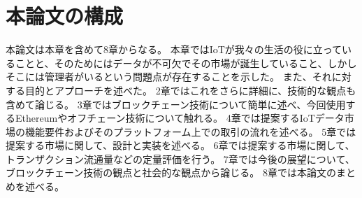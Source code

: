 \section{本論文の構成}
本論文は本章を含めて8章からなる。
本章ではIoTが我々の生活の役に立っていることと、そのためにはデータが不可欠でその市場が誕生していること、しかしそこには管理者がいるという問題点が存在することを示した。
また、それに対する目的とアプローチを述べた。
2章ではこれをさらに詳細に、技術的な観点も含めて論じる。
3章ではブロックチェーン技術について簡単に述べ、今回使用するEthereumやオフチェーン技術について触れる。
4章では提案するIoTデータ市場の機能要件およびそのプラットフォーム上での取引の流れを述べる。
5章では提案する市場に関して、設計と実装を述べる。
6章では提案する市場に関して、トランザクション流通量などの定量評価を行う。
7章では今後の展望について、ブロックチェーン技術の観点と社会的な観点から論じる。
8章では本論文のまとめを述べる。